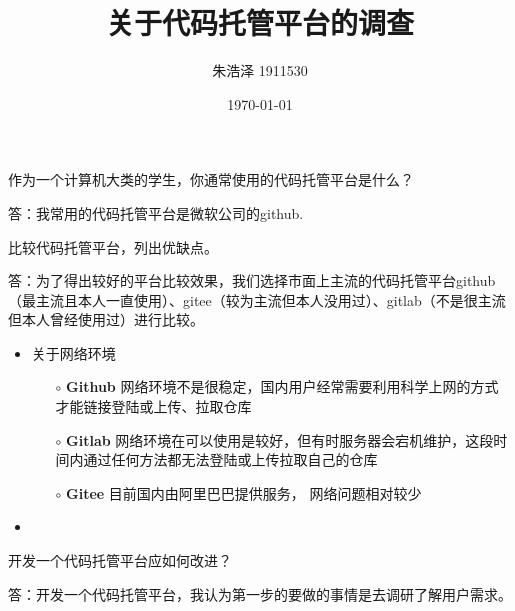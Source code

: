 \documentclass{homework}
\author{朱浩泽 1911530}
\date{\today}
\title{\Large{关于代码托管平台的调查}}
\begin{document}
 \maketitle

\question \large{作为一个计算机大类的学生，你通常使用的代码托管平台是什么？}

\normalsize{答：我常用的代码托管平台是微软公司的github.}

\question \large{比较代码托管平台，列出优缺点。}
\normalsize

答：为了得出较好的平台比较效果，我们选择市面上主流的代码托管平台github（最主流且本人一直使用）、gitee（较为主流但本人没用过）、gitlab（不是很主流但本人曾经使用过）进行比较。
\begin{itemize}
	\item 关于网络环境
		\begin{itemize}
			\item[$\circ$] \textbf{Github}  网络环境不是很稳定，国内用户经常需要利用科学上网的方式才能链接登陆或上传、拉取仓库
			\item[$\circ$] \textbf{Gitlab}  网络环境在可以使用是较好，但有时服务器会宕机维护，这段时间内通过任何方法都无法登陆或上传拉取自己的仓库
			\item[$\circ$] \textbf{Gitee}  目前国内由阿里巴巴提供服务， 网络问题相对较少
		\end{itemize}
	\item 
\end{itemize}

\question 开发一个代码托管平台应如何改进？

答：开发一个代码托管平台，我认为第一步的要做的事情是去调研了解用户需求。
\end{document}
